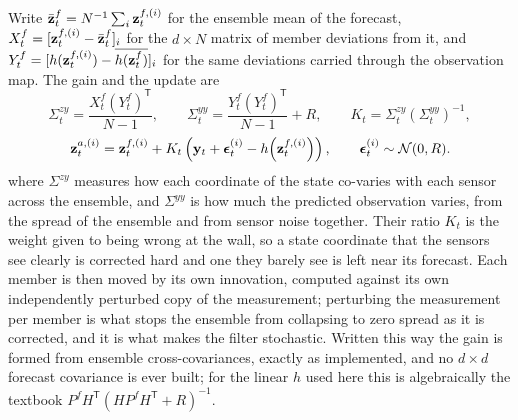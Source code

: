 Write $\bar{\mathbf{z}}^{f}_t = N^{-1}\sum_i \mathbf{z}^{f,(i)}_t$ for the ensemble mean
of the forecast, $X^{f}_t = [\mathbf{z}^{f,(i)}_t - \bar{\mathbf{z}}^{f}_t]_i$ for the
$d \times N$ matrix of member deviations from it, and
$Y^{f}_t = [h(\mathbf{z}^{f,(i)}_t) - \overline{h(\mathbf{z}^{f}_t)}]_i$ for the same
deviations carried through the observation map. The gain and the update are
\begin{equation}
  \Sigma^{zy}_t = \frac{X^{f}_t (Y^{f}_t)^{\mathsf{T}}}{N - 1}, \qquad
  \Sigma^{yy}_t = \frac{Y^{f}_t (Y^{f}_t)^{\mathsf{T}}}{N - 1} + R, \qquad
  K_t = \Sigma^{zy}_t \left(\Sigma^{yy}_t\right)^{-1},
  \label{eq:enkf_gain}
\end{equation}
\begin{equation}
  \mathbf{z}^{a,(i)}_t = \mathbf{z}^{f,(i)}_t
  + K_t \left(\mathbf{y}_t + \boldsymbol{\epsilon}^{(i)}_t
  - h\!\left(\mathbf{z}^{f,(i)}_t\right)\right),
  \qquad \boldsymbol{\epsilon}^{(i)}_t \sim \mathcal{N}(0, R).
  \label{eq:enkf_update}
\end{equation}
where $\Sigma^{zy}$ measures how each coordinate of the state co-varies
with each sensor across the ensemble, and $\Sigma^{yy}$ is how much the
predicted observation varies, from the spread of the ensemble and from sensor
noise together. Their ratio $K_t$ is the weight given to being wrong at the
wall, so a state coordinate that the sensors see clearly is corrected hard and
one they barely see is left near its forecast. Each member is then moved by its
own innovation, computed against its own independently perturbed copy of the
measurement; perturbing the measurement per member is what stops the ensemble
from collapsing to zero spread as it is corrected, and it is what makes the
filter stochastic. Written this way the gain is formed from ensemble
cross-covariances, exactly as implemented, and no $d \times d$ forecast
covariance is ever built; for the linear $h$ used here this is algebraically
the textbook $P^{f}H^{\mathsf{T}}(HP^{f}H^{\mathsf{T}} + R)^{-1}$.\re


